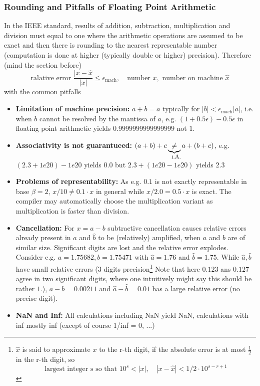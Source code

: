 \subsubsection{Rounding and Pitfalls of Floating Point Arithmetic}
In the IEEE standard, results of addition, subtraction, multiplication and division must equal to
one where the arithmetic operations are assumed to be exact and then there is rounding to the nearest
representable number (computation is done at higher (typically double or higher) precision). Therefore (mind the section before)
\begin{equation}
    \text{ralative error } \frac{|x-\hat{x}}{|x|} \leq \epsilon_{\text{mach}}, \quad \text{number } x, \text{ number on machine } \hat{x}
\end{equation}
with the common pitfalls
\begin{itemize}
    \item \textcolor{red1}{\textbf{Limitation of machine precision:}} $a+b=a$ typically for $|b| < \epsilon_{\text{mach}} |a|$, i.e. when $b$ cannot be resolved by the mantissa of $a$, e.g. $(1+0.5\epsilon) - 0.5\epsilon$ in floating point arithmetic yields $0.9999999999999999$ not $1$.
    \item \textcolor{red1}{\textbf{Associativity is not guarantueed:}} $(a+b)+c \explain{\ne}{i.A.} a+(b+c)$, e.g. $(2.3 + 1e20) - 1e20$ yields $0.0$ but $2.3 + (1e20 - 1e20)$ yields $2.3$
    \item \textcolor{red1}{\textbf{Problems of representability:}} As e.g. $0.1$ is not exactly representable in base $\beta = 2$, $x/10 \ne 0.1 \cdot x$ in general while $x/2.0 = 0.5 \cdot x$ is exact. The compiler may automatically choose the multiplication variant as multiplication is faster than division.
    \item \textcolor{red1}{\textbf{Cancellation:}} For $x = a - b$ subtractive cancellation causes relative errors already present in $\hat{a}$ and $\hat{b}$ to be (relatively) amplified, when $a$ and $b$ are of similar size. Significant digits are lost and the relative error explodes. Consider e.g. $a = 1.75682, b = 1.75471$ with $\hat{a} = 1.76$ and $\hat{b} = 1.75$. While $\hat{a},\hat{b}$ have small relative errors (3 digits precision\footnote{$\hat{x}$ is said to approximate $x$ to the r-th digit, if the absolute error is at most $\frac{1}{2}$ in the r-th digit, so 
    \begin{equation} \text{largest integer s so that } 10^s < |x|, \quad |x-\hat{x}| < 1/2 \cdot 10^{s-r+1} \end{equation}} Note that here $0.123$ ans $0.127$ agree in two significant digits, where one intuitively might say this should be rather $1$.), $a-b = 0.00211$ and $\hat{a} - \hat{b} = 0.01$ has a large relative error (no precise digit).
    \item \textcolor{red1}{\textbf{NaN and Inf:}} All calculations including NaN yield NaN, calculations with inf mostly inf (except of course 1/inf = 0, ...)
\end{itemize}
